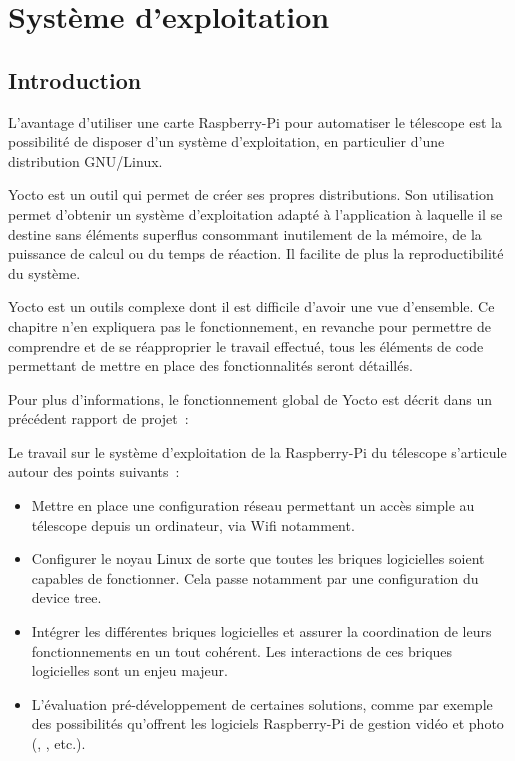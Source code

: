 \chapter{Système d'exploitation}

\section{Introduction}

L'avantage d'utiliser une carte Raspberry-Pi pour automatiser le télescope est la possibilité de disposer d'un système d'exploitation, en particulier d'une distribution GNU/Linux.

\vspace{1cm}

Yocto est un outil qui permet de créer ses propres distributions. Son utilisation permet d'obtenir un système d'exploitation adapté à l'application à laquelle il se destine sans éléments superflus consommant inutilement de la mémoire, de la puissance de calcul ou du temps de réaction. Il facilite de plus la reproductibilité du système.

Yocto est un outils complexe dont il est difficile d'avoir une vue d'ensemble. Ce chapitre n'en expliquera pas le fonctionnement, en revanche pour permettre de comprendre et de se réapproprier le travail effectué, tous les éléments de code permettant de mettre en place des fonctionnalités seront détaillés.

Pour plus d'informations, le fonctionnement global de Yocto est décrit dans un précédent rapport de projet~: {\href{https://github.com/thomaslepoix/ESTEI/blob/master/M1_Projet_Telecommande_Raspberry-Pi/Hardware_Middleware.pdf}{\\}}

\vspace{1cm}

Le travail sur le système d'exploitation de la Raspberry-Pi du télescope s'articule autour des points suivants~:
\begin{itemize}[label=$\bullet$]
	\item Mettre en place une configuration réseau permettant un accès simple au télescope depuis un ordinateur, via Wifi notamment.
	\item Configurer le noyau Linux de sorte que toutes les briques logicielles soient capables de fonctionner. Cela passe notamment par une configuration du device tree.
	\item Intégrer les différentes briques logicielles et assurer la coordination de leurs fonctionnements en un tout cohérent. Les interactions de ces briques logicielles sont un enjeu majeur.
	\item L'évaluation pré-développement de certaines solutions, comme par exemple des possibilités qu'offrent les logiciels Raspberry-Pi de gestion vidéo et photo (, , etc.).
	\end{itemize}

